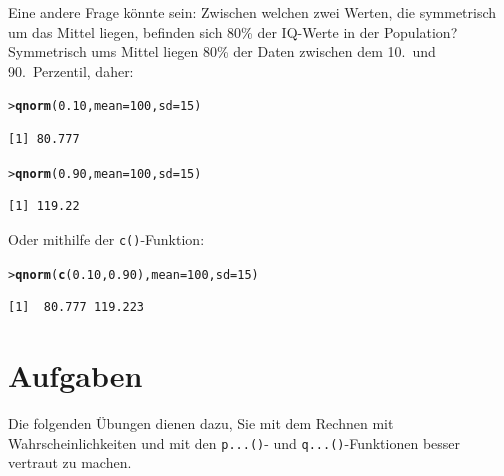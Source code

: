 \documentclass[oneside, 10pt]{book}\usepackage[]{graphicx}\usepackage[]{xcolor}
\makeatletter
\newcommand{\hlnum}[1]{\textcolor[rgb]{0.686,0.059,0.569}{#1}}%
\newcommand{\hlstd}[1]{\textcolor[rgb]{0.345,0.345,0.345}{#1}}%
\newcommand{\hlkwc}[1]{\textcolor[rgb]{0.333,0.667,0.333}{#1}}%
\newcommand{\hlkwd}[1]{\textcolor[rgb]{0.737,0.353,0.396}{\textbf{#1}}}%
\newenvironment{kframe}{%
 \def\at@end@of@kframe{}%
 \ifinner\ifhmode%
  \def\at@end@of@kframe{\end{minipage}}%
  \begin{minipage}{\columnwidth}%
 \fi\fi%
 \def\FrameCommand##1{\hskip\@totalleftmargin \hskip-\fboxsep
 \colorbox{shadecolor}{##1}\hskip-\fboxsep
     \hskip-\linewidth \hskip-\@totalleftmargin \hskip\columnwidth}%
 \MakeFramed {\advance\hsize-\width
   \@totalleftmargin\z@ \linewidth\hsize
   \@setminipage}}%
 {\par\unskip\endMakeFramed%
 \at@end@of@kframe}
\newenvironment{knitrout}{}{} %
\makeatother
\begin{document}
Eine andere Frage könnte sein: Zwischen welchen zwei Werten, die symmetrisch
um das Mittel liegen, befinden sich 80\% der IQ-Werte in der Population?
Symmetrisch ums Mittel liegen 80\% der Daten zwischen dem 10.\ und 90.\ Perzentil, daher:
\begin{knitrout}
\color{fgcolor}\begin{kframe}
\begin{alltt}
\hlstd{> }\hlkwd{qnorm}\hlstd{(}\hlnum{0.10}\hlstd{,} \hlkwc{mean} \hlstd{=} \hlnum{100}\hlstd{,} \hlkwc{sd} \hlstd{=} \hlnum{15}\hlstd{)}
\end{alltt}
\begin{verbatim}
[1] 80.777
\end{verbatim}
\begin{alltt}
\hlstd{> }\hlkwd{qnorm}\hlstd{(}\hlnum{0.90}\hlstd{,} \hlkwc{mean} \hlstd{=} \hlnum{100}\hlstd{,} \hlkwc{sd} \hlstd{=} \hlnum{15}\hlstd{)}
\end{alltt}
\begin{verbatim}
[1] 119.22
\end{verbatim}
\end{kframe}
\end{knitrout}
Oder mithilfe der \texttt{c()}-Funktion:
\begin{knitrout}
\color{fgcolor}\begin{kframe}
\begin{alltt}
\hlstd{> }\hlkwd{qnorm}\hlstd{(}\hlkwd{c}\hlstd{(}\hlnum{0.10}\hlstd{,} \hlnum{0.90}\hlstd{),} \hlkwc{mean} \hlstd{=} \hlnum{100}\hlstd{,} \hlkwc{sd} \hlstd{=} \hlnum{15}\hlstd{)}
\end{alltt}
\begin{verbatim}
[1]  80.777 119.223
\end{verbatim}
\end{kframe}
\end{knitrout}

\section{Aufgaben}\label{sec:uebungenprobability}

Die folgenden Übungen dienen dazu,
Sie mit dem Rechnen mit Wahrscheinlichkeiten und mit
den \texttt{p...()}- und \texttt{q...()}-Funktionen 
besser vertraut zu machen.
\end{document}
